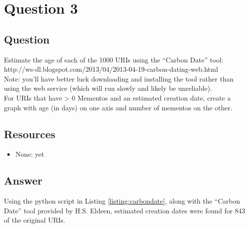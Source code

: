\section{Question 3}

\subsection{Question}
Estimate the age of each of the 1000 URIs using the ``Carbon Date'' tool:\\

http://ws-dl.blogspot.com/2013/04/2013-04-19-carbon-dating-web.html\\

Note: you'll have better luck downloading and installing the tool 
rather than using the web service (which will run slowly and likely
be unreliable).\\

For URIs that have > 0 Mementos and an estimated creation date,
create a graph with age (in days) on one axis and number of mementos
on the other.\\

\subsection{Resources}
\begin{itemize}
\item None: yet
\end{itemize}

\subsection{Answer}
Using the python script in Listing \ref{listing:carbondate}, along with the 
``Carbon Date'' tool provided by H.S. Eldeen, estimated creation dates were found for
843 of the original URIs.

